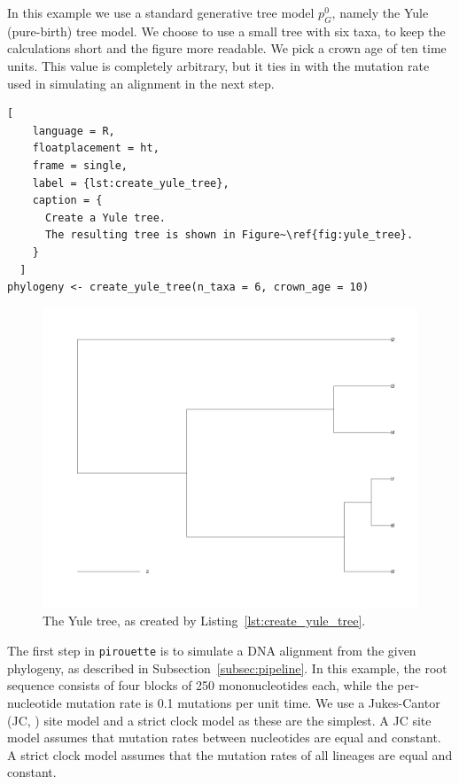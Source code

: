 In this example we use a standard generative tree model $\mathit{p_{G}^0}$, 
namely the Yule (pure-birth) tree model. 
We choose to use a small tree with six taxa, to keep
the calculations short and the figure more readable.
We pick a crown age of ten time units. This value is 
completely arbitrary, but it ties in with the mutation rate 
used in simulating an alignment in the next step.

\begin{lstlisting}[
    language = R,
    floatplacement = ht,
    frame = single, 
    label = {lst:create_yule_tree}, 
    caption = {
      Create a Yule tree. 
      The resulting tree is shown in Figure~\ref{fig:yule_tree}.
    }
  ]
phylogeny <- create_yule_tree(n_taxa = 6, crown_age = 10)
\end{lstlisting}

\begin{figure}[ht]
  \includegraphics[width=\textwidth]{pirouette_example_1/example_1_314/true_tree.png}
  \caption{The Yule tree, as created by Listing~\ref{lst:create_yule_tree}.}
  \label{fig:yule_tree}
\end{figure}

The first step in \verb;pirouette; is to simulate a DNA alignment from the 
given phylogeny, as described in Subsection~\ref{subsec:pipeline}.
In this example, the root sequence consists of four blocks of 250 
mononucleotides each, while the per-nucleotide mutation rate is 
0.1 mutations per unit time.
We use a Jukes-Cantor (JC, \cite{jukes1969evolution}) site model
and a strict clock model as these are the simplest.
A JC site model assumes that mutation rates between nucleotides are equal and 
constant. 
A strict clock model assumes that the mutation rates 
of all lineages are equal and constant.

